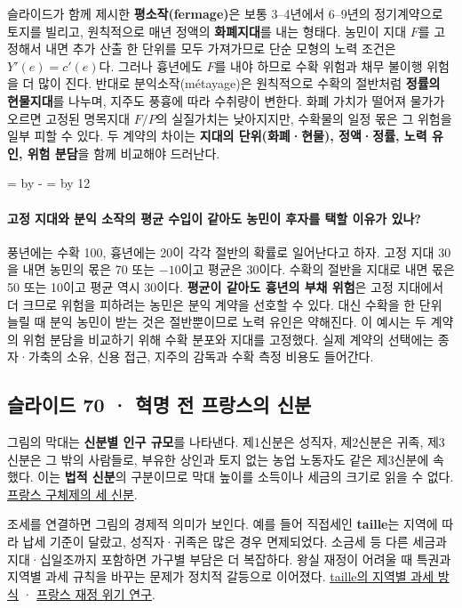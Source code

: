 \documentclass[10pt,a4paper]{article}
\newcommand{\ReserveQuestionSpace}{%
  \par\begingroup
  \dimen0=\pagegoal \advance\dimen0 by -\pagetotal
  \dimen2=\baselineskip \multiply\dimen2 by 12
  \ifdim\dimen0<\dimen2 \newpage\fi
  \endgroup}
\begin{document}
슬라이드가 함께 제시한 \textbf{평소작(fermage)}은 보통 3–4년에서 6–9년의 정기계약으로 토지를 빌리고, 원칙적으로 매년 정액의 \textbf{화폐지대}를 내는 형태다. 농민이 지대 $F$를 고정해서 내면 추가 산출 한 단위를 모두 가져가므로 단순 모형의 노력 조건은 $Y'(e)=c'(e)$다. 그러나 흉년에도 $F$를 내야 하므로 수확 위험과 채무 불이행 위험을 더 많이 진다. 반대로 분익소작(métayage)은 원칙적으로 수확의 절반처럼 \textbf{정률의 현물지대}를 나누며, 지주도 풍흉에 따라 수취량이 변한다. 화폐 가치가 떨어져 물가가 오르면 고정된 명목지대 $F/P$의 실질가치는 낮아지지만, 수확물의 일정 몫은 그 위험을 일부 피할 수 있다. 두 계약의 차이는 \textbf{지대의 단위(화폐·현물), 정액·정률, 노력 유인, 위험 분담}을 함께 비교해야 드러난다.\par

\ReserveQuestionSpace
\paragraph{고정 지대와 분익 소작의 평균 수입이 같아도 농민이 후자를 택할 이유가 있나?}

풍년에는 수확 100, 흉년에는 20이 각각 절반의 확률로 일어난다고 하자. 고정 지대 30을 내면 농민의 몫은 70 또는 $-10$이고 평균은 30이다. 수확의 절반을 지대로 내면 몫은 50 또는 10이고 평균 역시 30이다. \textbf{평균이 같아도 흉년의 부채 위험}은 고정 지대에서 더 크므로 위험을 피하려는 농민은 분익 계약을 선호할 수 있다. 대신 수확을 한 단위 늘릴 때 분익 농민이 받는 것은 절반뿐이므로 노력 유인은 약해진다. 이 예시는 두 계약의 위험 분담을 비교하기 위해 수확 분포와 지대를 고정했다. 실제 계약의 선택에는 종자·가축의 소유, 신용 접근, 지주의 감독과 수확 측정 비용도 들어간다.\par

\subsection{슬라이드 70 · 혁명 전 프랑스의 신분}
그림의 막대는 \textbf{신분별 인구 규모}를 나타낸다. 제1신분은 성직자, 제2신분은 귀족, 제3신분은 그 밖의 사람들로, 부유한 상인과 토지 없는 농업 노동자도 같은 제3신분에 속했다. 이는 \textbf{법적 신분}의 구분이므로 막대 높이를 소득이나 세금의 크기로 읽을 수 없다. \href{https://www.larousse.fr/dictionnaires/college/Ancien\_R\%C3\%A9gime/1607}{프랑스 구체제의 세 신분}.\par

조세를 연결하면 그림의 경제적 의미가 보인다. 예를 들어 직접세인 \textbf{taille}는 지역에 따라 납세 기준이 달랐고, 성직자·귀족은 많은 경우 면제되었다. 소금세 등 다른 세금과 지대·십일조까지 포함하면 가구별 부담은 더 복잡하다. 왕실 재정이 어려울 때 특권과 지역별 과세 규칙을 바꾸는 문제가 정치적 갈등으로 이어졌다. \href{https://www.larousse.fr/encyclopedie/divers/taille/186114}{taille의 지역별 과세 방식} · \href{https://www.cambridge.org/core/books/abs/french-revolution/fiscal-crisis/4511884C551707E4455A2366083ECA71}{프랑스 재정 위기 연구}.\par
\end{document}
